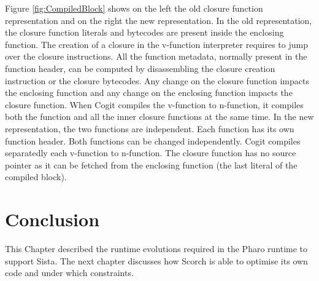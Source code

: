 \documentclass[a4paper,12pt,twoside]{../includes/ThesisStyle}
\begin{document}
Figure \ref{fig:CompiledBlock} shows on the left the old closure function representation and on the right the new representation. In the old representation, the closure function literals and bytecodes are present inside the enclosing function. The creation of a closure in the v-function interpreter requires to jump over the closure instructions. All the function metadata, normally present in the function header, can be computed by disassembling the closure creation instruction or the closure bytecodes. Any change on the closure function impacts the enclosing function and any change on the enclosing function impacts the closure function. When Cogit compiles the v-function to n-function, it compiles both the function and all the inner closure functions at the same time. In the new representation, the two functions are independent. Each function has its own function header. Both functions can be changed independently. Cogit compiles separatedly each v-function to n-function. The closure function has no source pointer as it can be fetched from the enclosing function (the last literal of the compiled block).

\section*{Conclusion}

This Chapter described the runtime evolutions required in the Pharo runtime to support Sista. The next chapter discusses how Scorch is able to optimise its own code and under which constraints.

\ifx\wholebook\relax\else
    
\end{document}

